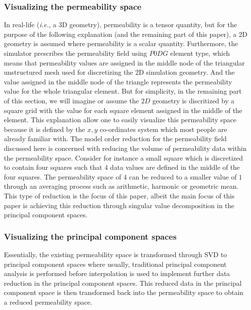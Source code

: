 \documentclass[preprint,12pt]{elsarticle}
\begin{document}
\subsubsection{Visualizing the permeability space}\label{subsubsection:visualization_permspace}
In real-life ({\it i.e.}, a 3D geometry), permeability is a tensor quantity, but for the purpose of the following explanation (and the remaining part of this paper), a 2D geometry is assumed where permeability is a scalar quantity. Furthermore, the simulator prescribes the permeability field using $P0DG$ element type, which means that permeability values are assigned in the middle node of the triangular unstructured mesh used for discretizing the 2D simulation geometry. And the value assigned in the middle node of the triangle represents the permeability value for the whole triangular element. But for simplicity, in the remaining part of this section, we will imagine or assume the $2D$ geometry is discritized by a square grid with the value for each square element assigned in the middle of the element. This explanation allow one to easily visualize this permeability space because it is defined by the $x,y$ co-ordinates  system which most people are already familiar with. The model order reduction for the permeability field discussed here is concerned with reducing the volume of permeability data within the permeability space. Consider for instance a small square which is discretized to contain four squares such that $4$ data values are defined in the middle of the four squares. The permeability space of $4$ can be reduced to a smaller value of $1$ through an averaging process such as arithmetic, harmonic or geometric mean. This type of reduction is the focus of this paper, albeit the main focus of this paper is achieving this reduction through singular value decomposition in the principal component spaces. 

\subsubsection{Visualizing the principal component spaces}\label{subsubsection:visualization_pcspaces}
Essentially, the existing permeability space is transformed through SVD to principal component spaces where usually, traditional principal component analysis is performed before interpolation is used to implement further data reduction in the principal component spaces. This reduced data in the principal component space is then transformed back into the permeability space to obtain a reduced permeability space.
\end{document}
